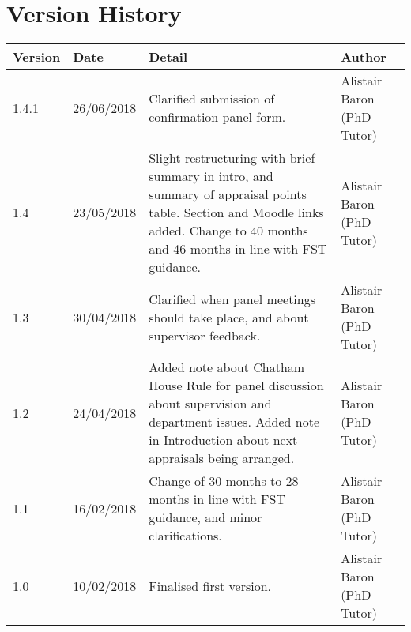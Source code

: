 \documentclass[12pt,a4paper]{article}
\begin{document}
\section{Version History}
\begin{tabularx}{\textwidth}{llXl}
	\textbf{Version} & \textbf{Date} & \textbf{Detail} & \textbf{Author} \\ 
	\hline
	1.4.1 & 26/06/2018 & Clarified submission of confirmation panel form. & Alistair Baron (PhD Tutor) \\
	1.4 & 23/05/2018 & Slight restructuring with brief summary in intro, and summary of appraisal points table. Section and Moodle links added. Change to 40 months and 46 months in line with FST guidance. & Alistair Baron (PhD Tutor) \\
	1.3 & 30/04/2018 & Clarified when panel meetings should take place, and about supervisor feedback. & Alistair Baron (PhD Tutor) \\
	1.2	& 24/04/2018 & Added note about Chatham House Rule for panel discussion about supervision and department issues. Added note in Introduction about next appraisals being arranged. & Alistair Baron (PhD Tutor) \\
	1.1	& 16/02/2018 & Change of 30 months to 28 months in line with FST guidance, and minor clarifications. & Alistair Baron (PhD Tutor) \\
	1.0 & 10/02/2018 & Finalised first version. & Alistair Baron (PhD Tutor) \\ 
\end{tabularx} 
\end{document}
